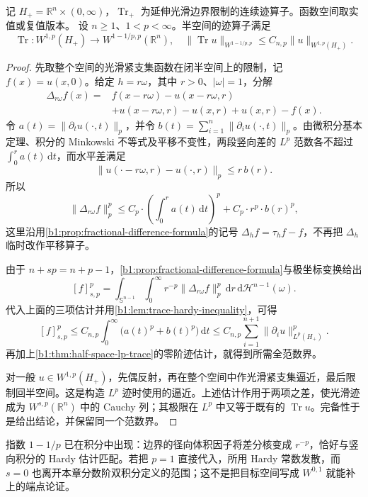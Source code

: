 \begin{theorem}[半空间分数阶迹]\label{b1:thm:half-space-fractional-trace}
记 \(H_+=\mathbb R^n\times(0,\infty)\)，\(\operatorname{Tr}_+\) 为延伸光滑边界限制的连续迹算子。函数空间取实值或复值版本。
设 \(n\ge1\)、\(1<p<\infty\)。半空间的迹算子满足
\[
 \operatorname{Tr}:W^{1,p}(H_+)
 \longrightarrow W^{1-1/p,p}(\mathbb R^n),\quad
 \|\operatorname{Tr}u\|_{W^{1-1/p,p}}
 \le C_{n,p}\|u\|_{W^{1,p}(H_+)}.
\]
\end{theorem}
\begin{proof}
先取整个空间的光滑紧支集函数在闭半空间上的限制，记 \(f(x)=u(x,0)\)。给定 \(h=r\omega\)，其中 \(r>0\)、\(|\omega|=1\)，分解
\[
 \begin{split}
 \Delta_{r\omega}f(x)
 ={}&f(x-r\omega)-u(x-r\omega,r)\\
    &+u(x-r\omega,r)-u(x,r)+u(x,r)-f(x).
 \end{split}
\]
令 \(a(t)=\|\partial_tu(\cdot,t)\|_p\)，并令
\(b(t)=\sum_{i=1}^n\|\partial_i u(\cdot,t)\|_p\)。由微积分基本定理、积分的 Minkowski 不等式及平移不变性，两段竖向差的 \(L^p\) 范数各不超过 \(\int_0^r a(t)\,\mathrm dt\)，而水平差满足
\[
 \|u(\cdot-r\omega,r)-u(\cdot,r)\|_p
 \le r\,b(r).
\]
所以
\[
 \|\Delta_{r\omega}f\|_p^p
 \le C_p\cdot\left(\int_0^r a(t)\,\mathrm dt\right)^p
       +C_p\cdot r^p\cdot b(r)^p,
\]
这里沿用\cref{b1:prop:fractional-difference-formula}的记号
\(\Delta_hf=\tau_hf-f\)，不再把 \(\Delta_h\) 临时改作平移算子。

由于 \(n+sp=n+p-1\)，\cref{b1:prop:fractional-difference-formula}与极坐标变换给出
\[
 [f]_{s,p}^p
 =\int_{\mathbb S^{n-1}}\int_0^\infty
       r^{-p}\|\Delta_{r\omega}f\|_p^p\,\mathrm dr\,
       \mathrm d\mathcal H^{n-1}(\omega).
\]
代入上面的三项估计并用\cref{b1:lem:trace-hardy-inequality}，可得
\[
 [f]_{s,p}^p
 \le C_{n,p}\int_0^\infty\bigl(a(t)^p+b(t)^p\bigr)\,\mathrm dt
 \le C_{n,p}\sum_{i=1}^{n+1}\|\partial_i u\|_{L^p(H_+)}^p.
\]
再加上\cref{b1:thm:half-space-lp-trace}的零阶迹估计，就得到所需全范数界。

对一般 \(u\in W^{1,p}(H_+)\)，先偶反射，再在整个空间中作光滑紧支集逼近，最后限制回半空间。这是构造 \(L^p\) 迹时使用的逼近。上述估计作用于两项之差，使光滑迹成为 \(W^{s,p}(\mathbb R^n)\) 中的 Cauchy 列；其极限在 \(L^p\) 中又等于既有的 \(\operatorname{Tr}u\)。完备性于是给出结论，并保留同一个范数界。
\end{proof}

指数 \(1-1/p\) 已在积分中出现：边界的径向体积因子将差分核变成 \(r^{-p}\)，恰好与竖向积分的 Hardy 估计匹配。若把 \(p=1\) 直接代入，所用 Hardy 常数发散，而 \(s=0\) 也离开本章分数阶双积分定义的范围；这不是把目标空间写成 \(W^{0,1}\) 就能补上的端点论证。


